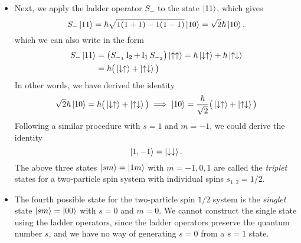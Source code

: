 \documentclass[11pt, a4paper]{article}
\newcommand{\ua}{\uparrow}  %
\newcommand{\da}{\downarrow}  %
\newcommand{\II}{\operatorname{I}}  %
\begin{document}
\begin{itemize}
    \item Next, we apply the ladder operator $ S_{-} $ to the state $ \ket{11} $, which gives
    \begin{equation*}
        S_{-}\ket{11} = \hbar \sqrt{1(1+1) - 1(1-1)} \ket{10} = \sqrt{2}\hbar \ket{10},
    \end{equation*}
    which we can also write in the form
    \begin{align*}
        S_{-}\ket{11} & = \big( S_{-_{1}}\II_{2} + \II_{1} S_{-_{2}} \big)\ket{\ua\ua} = \hbar \ket{\da\ua} + \hbar \ket{\ua\da}\\
        &= \hbar \big( \ket{\da\ua} + \ket{\ua\da} \big)
    \end{align*}
    In other words, we have derived the identity
    \begin{equation*}
        \sqrt{2}\hbar \ket{10} = \hbar \big( \ket{\da\ua} + \ket{\ua\da} \big) \implies \ket{10} = \frac{\hbar}{\sqrt{2}} \big( \ket{\da\ua} + \ket{\ua\da} \big)
    \end{equation*}
    Following a similar procedure with $ s = 1 $ and $ m = -1 $, we could derive the identity
    \begin{equation*}
        \ket{1, -1} = \ket{\da\da}.
    \end{equation*}
    The above three states $ \ket{sm} = \ket{1m} $ with $ m = -1, 0, 1 $ are called the \textit{triplet} states for a two-particle spin system with individual spins $ s_{1,2} = 1/2 $.

    \item The fourth possible state for the two-particle spin $ 1/2 $ system is the \textit{singlet} state $ \ket{sm} = \ket{00} $ with $ s = 0 $ and $ m = 0 $. We cannot construct the single state using the ladder operators, since the ladder operators preserve the quantum number $ s $, and we have no way of generating $ s = 0 $ from a $ s = 1 $ state. 


\end{itemize}
\end{document}
